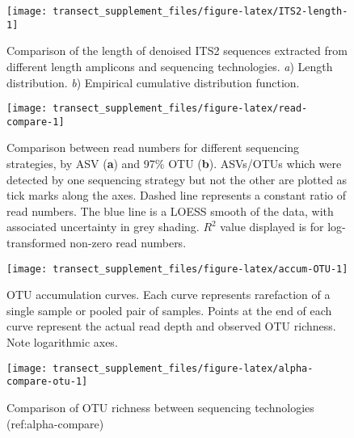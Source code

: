\documentclass[
]{article}
\begin{document}
\begin{figure}

{\centering \texttt{[image: transect\_supplement\_files/figure-latex/ITS2-length-1]} 

}

\caption[Comparison of the length of denoised ITS2 sequences extracted from different length amplicons and sequencing technologies]{Comparison of the length of denoised ITS2 sequences extracted from different length amplicons and sequencing technologies. \emph{a}) Length distribution. \emph{b}) Empirical cumulative distribution function.}\label{fig:ITS2-length}
\end{figure}





\begin{figure}

{\centering \texttt{[image: transect\_supplement\_files/figure-latex/read-compare-1]} 

}

\caption[Comparison between read numbers for different sequencing strategies]{Comparison between read numbers for different sequencing strategies, by ASV (\textbf{a}) and 97\% OTU (\textbf{b}). ASVs/OTUs which were detected by one sequencing strategy but not the other are plotted as tick marks along the axes. Dashed line represents a constant ratio of read numbers. The blue line is a LOESS smooth of the data, with associated uncertainty in grey shading. \(R^2\) value displayed is for log-transformed non-zero read numbers.}\label{fig:read-compare}
\end{figure}





\begin{figure}

{\centering \texttt{[image: transect\_supplement\_files/figure-latex/accum-OTU-1]} 

}

\caption[OTU accumulation curves]{OTU accumulation curves. Each curve represents rarefaction of a single sample or pooled pair of samples. Points at the end of each curve represent the actual read depth and observed OTU richness. Note logarithmic axes.}\label{fig:accum-OTU}
\end{figure}





\begin{figure}

{\centering \texttt{[image: transect\_supplement\_files/figure-latex/alpha-compare-otu-1]} 

}

\caption[Comparison of OTU richness between sequencing technologies]{Comparison of OTU richness between sequencing technologies (ref:alpha-compare)}\label{fig:alpha-compare-otu}
\end{figure}
\end{document}
